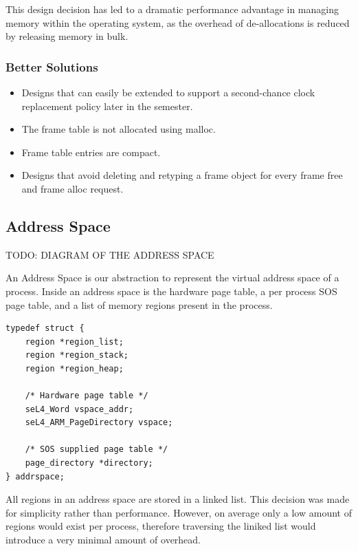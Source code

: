 \documentclass[runningheads,a4paper]{llncs}
\begin{document}
This design decision has led to a dramatic performance advantage in managing memory within the operating system, as the overhead of de-allocations is reduced by releasing memory in bulk.

\subsubsection{Better Solutions}

\begin{itemize}[label={\checkmark}]
  \item Designs that can easily be extended to support a second-chance clock replacement policy later in the semester.
  \item The frame table is not allocated using malloc.
  \item Frame table entries are compact.
  \item Designs that avoid deleting and retyping a frame object for every frame free and frame alloc request.
\end{itemize}

\medskip
\medskip

\subsection{Address Space}

TODO: DIAGRAM OF THE ADDRESS SPACE

An Address Space is our abstraction to represent the virtual address space of a process. Inside an address space is the hardware page table, a per process SOS page table, and a list of memory regions present in the process.

\begin{lstlisting}[style=CStyle]
typedef struct {
    region *region_list;
    region *region_stack;
    region *region_heap;

    /* Hardware page table */
    seL4_Word vspace_addr;
    seL4_ARM_PageDirectory vspace;

    /* SOS supplied page table */
    page_directory *directory;
} addrspace;
\end{lstlisting}

All regions in an address space are stored in a linked list. This decision was made for simplicity rather than performance. However, on average only a low amount of regions would exist per process, therefore traversing the liniked list would introduce a very minimal amount of overhead.
\end{document}

